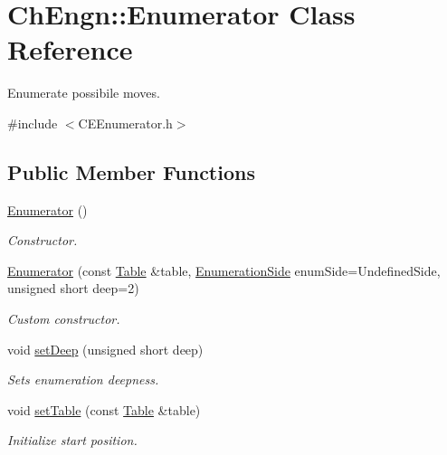 \hypertarget{classChEngn_1_1Enumerator}{
\section{ChEngn::Enumerator Class Reference}
\label{classChEngn_1_1Enumerator}
}


Enumerate possibile moves.  




{\ttfamily \#include $<$CEEnumerator.h$>$}

\subsection*{Public Member Functions}
\begin{DoxyCompactItemize}
\item 
\hyperlink{classChEngn_1_1Enumerator_a5103837e1ff53c5cd9dd3eba8f2bb555}{Enumerator} ()
\begin{DoxyCompactList}\small\item\em Constructor. \item\end{DoxyCompactList}\item 
\hyperlink{classChEngn_1_1Enumerator_a3f3a7d688b6753ff1b6118c43745ed79}{Enumerator} (const \hyperlink{classChEngn_1_1Table}{Table} \&table, \hyperlink{namespaceChEngn_a680bcca190861d8cee0f8627ce8f9de3}{EnumerationSide} enumSide=UndefinedSide, unsigned short deep=2)
\begin{DoxyCompactList}\small\item\em Custom constructor. \item\end{DoxyCompactList}\item 
void \hyperlink{classChEngn_1_1Enumerator_ad863ed7a8a9d3bf4c2f6515b822127b9}{setDeep} (unsigned short deep)
\begin{DoxyCompactList}\small\item\em Sets enumeration deepness. \item\end{DoxyCompactList}\item 
void \hyperlink{classChEngn_1_1Enumerator_aece55d1e95762d5a36c1bf43f72936a1}{setTable} (const \hyperlink{classChEngn_1_1Table}{Table} \&table)
\begin{DoxyCompactList}\small\item\em Initialize start position. \item\end{DoxyCompactList}\item 

\end{DoxyCompactItemize}
